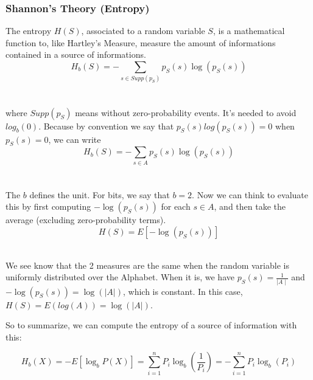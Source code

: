 \documentclass{article}
\begin{document}
\subsubsection{Shannon's Theory (Entropy)} The entropy $ H(S) $, associated to a random variable $ S $, is a mathematical function to, like Hartley's Measure, measure the amount of informations contained in a source of informations.
\begin{equation}
H_b(S) = - \sum_{s \in Supp(p_S)}p_S(s)\log(p_S(s))
\end{equation}
\\
\\
where $ Supp(p_S) $ means without zero-probability events. It's needed to avoid $ log_b(0) $. Because by convention we say that $ p_S(s)log(p_S(s)) = 0 $ when $ p_S(s) = 0 $, we can write
\begin{equation}
H_b(S) = - \sum_{s \in A}p_S(s)\log(p_S(s))
\end{equation}
\\
\\
The $ b $ defines the unit. For bits, we say that $ b = 2 $. Now we can think to evaluate this by first computing $ -\log(p_S(s)) $ for each $ s \in A $, and then take the average (excluding zero-probability terms).
\begin{equation}
H(S) = E[-\log(p_S(s))]
\end{equation}
\\
\begin{tcolorbox}[width=12.1cm, leftrule=3mm]
We see know that the 2 measures are the same when the random variable is uniformly distributed over the Alphabet. When it is, we have $ p_S(s) = \frac{1}{\mid A \mid} $ and $ -\log(p_S(s)) = \log(|A|) $, which is constant. In this case, $ H(S) = E(log(A)) = \log(|A|) $.
\end{tcolorbox}

So to summarize, we can compute the entropy of a source of information with this:
\begin{tcolorbox}[sharp corners, colback=green!30, colframe=green!80!blue, title=Entropy Calculation]
\begin{equation}
H_b(X) = -E[\log_bP(X)] = \sum_{i=1}^{n}P_i\log_b(\frac{1}{P_i}) = - \sum_{i=1}^{n}P_i\log_b(P_i)
\end{equation}
\end{tcolorbox}
\end{document}
